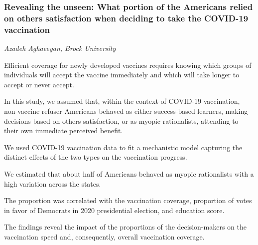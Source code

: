 \subsubsection*{Revealing the unseen: What portion of the Americans relied on others\textquotesingle{} satisfaction when deciding to take the COVID-19 vaccination}
\textit{Azadeh Aghaeeyan, Brock University}

Efficient coverage for newly developed vaccines requires knowing which
groups of individuals will accept the vaccine immediately and which will
take longer to accept or never accept.

In this study, we assumed that, within the context of COVID-19
vaccination, non-vaccine refuser Americans behaved as either
success-based learners, making decisions based on
others\textquotesingle{} satisfaction, or as myopic rationalists,
attending to their own immediate perceived benefit.

We used COVID-19 vaccination data to fit a mechanistic model capturing
the distinct effects of the two types on the vaccination progress.

We estimated that about half of Americans behaved as myopic rationalists
with a high variation across the states.

The proportion was correlated with the vaccination coverage, proportion
of votes in favor of Democrats in 2020 presidential election, and
education score.

The findings reveal the impact of the proportions of the decision-makers
on the vaccination speed and, consequently, overall vaccination
coverage.
